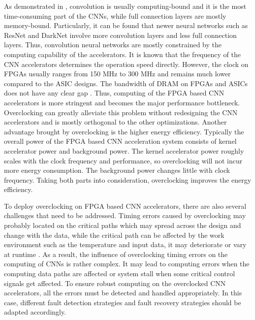 As demonstrated in \cite{Caffeine_6}, convolution is usually 
computing-bound and it is the most time-consuming part of the CNNs, while 
full connection layers are mostly memory-bound. Particularly, it can be found that 
newer neural networks such as ResNet and DarkNet involve more 
convolution layers and less full connection layers. Thus, convolution neural 
networks are mostly constrained by the computing capability of the accelerators. 
It is known that the frequency of the CNN 
accelerators determines the operation speed directly. However, 
the clock on FPGAs usually ranges from 150 MHz to 300 MHz and 
remains much lower compared to the ASIC designs. The 
bandwidth of DRAM on FPGAs and ASICs does not have any 
clear gap \cite{asic_fpga}. Thus, computing of the FPGA based CNN 
accelerators is more stringent and becomes the major 
performance bottleneck. Overclocking can greatly alleviate this 
problem without redesigning the CNN accelerators and is 
mostly orthogonal to the other optimizations. 
Another advantage brought by overclocking is the higher 
energy efficiency\cite{Paceline_15}. Typically the overall power of the 
FPGA based CNN acceleration system consists of kernel accelerator power 
and background power. The kernel accelerator power 
roughly scales with the clock frequency and performance, 
so overclocking will not incur more energy consumption. 
The background power changes little with clock frequency. 
Taking both parts into consideration, overclocking improves the energy efficiency.

To deploy overclocking on FPGA based CNN accelerators, there are also several
challenges that need to be addressed. Timing errors caused by overclocking 
may probably located on the critical paths which may spread across the 
design and change with the data, while the critical path can be
affected by the work environment such as the temperature 
and input data, it may deteriorate or vary at runtime \cite{Paceline_15}. 
As a result, the influence of overclocking timing 
errors on the computing of CNNs is rather complex. It may lead to
computing errors when the computing data paths are affected or system stall 
when some critical control signals get affected. To ensure robust computing 
on the overclocked CNN accelerators, all the errors must be detected and 
handled appropriately. In this case, different fault detection strategies 
and fault recovery strategies should be adapted accordingly. 

